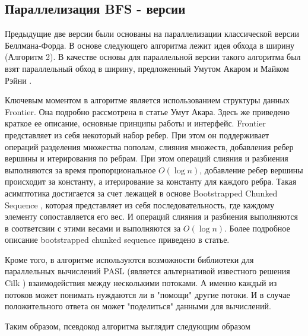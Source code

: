 \FloatBarrier
\subsection{Параллелизация BFS - версии}
Предыдущие две версии были основаны на параллелизации классической версии Беллмана-Форда. В основе следующего алгоритма лежит идея обхода в ширину (Алгоритм 2). В качестве основы для параллельной версии такого алгоритма был взят параллельный обход в ширину, предложенный Умутом Акаром и Майком Рэйни \cite{FRONTIERSEARCH}. 


Ключевым моментом в алгоритме является использованием структуры данных Frontier. Она подробно рассмотрена в статье Умут Акара. Здесь же приведено краткое ее описание, основные принципы работы и интерфейс. Frontier представляет из себя некоторый набор ребер. При этом он поддерживает операций разделения множества пополам, слияния множеств, добавления ребер вершины и итерирования по ребрам. При этом  операций слияния и разбиения выполняются за время пропорциональное $O(\log n)$, добавление ребер вершины происходит за константу, а итерирование за константу для каждого ребра. Такая асимптотика достигается за счет лежащей в основе Bootstrapped Chunked Sequence \cite{CHUNKEDSEQ}, которая представляет из себя последовательность, где каждому элементу сопоставляется его вес. И операций слияния и разбиения выполняются в соответсвии с этими весами и выполняются за $O(\log n)$. Более подробное описание bootstrapped chunked sequence приведено в статье. 

Кроме того, в алгоритме используются возможности библиотеки для параллельных вычислений PASL \cite{PASL} (является альтернативой известного решения Cilk \cite{CILK}) взаимодействия между несколькими потоками. А именно каждый из потоков может понимать нуждаются ли в "помощи" другие потоки. И в случае положительного ответа он может "поделиться" данными для вычислений. 

Таким образом, псевдокод алгоритма выглядит следующим образом

